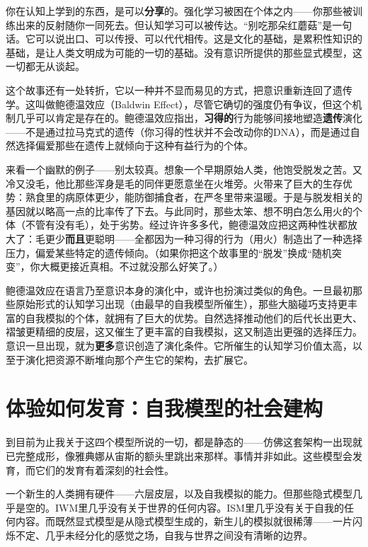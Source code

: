 \documentclass[11pt, twoside, openright]{book}
\begin{document}
你在认知上学到的东西，是可以\textbf{分享}的。强化学习被困在个体之内------你那些被训练出来的反射随你一同死去。但认知学习可以被传达。“别吃那朵红蘑菇”是一句话。它可以说出口、可以传授、可以代代相传。这是文化的基础，是累积性知识的基础，是让人类文明成为可能的一切的基础。没有意识所提供的那些显式模型，这一切都无从谈起。

这个故事还有一处转折，它以一种并不显而易见的方式，把意识重新连回了遗传学。这叫做鲍德温效应（Baldwin Effect），尽管它确切的强度仍有争议，但这个机制几乎可以肯定是存在的。鲍德温效应指出，\textbf{习得的}行为能够间接地塑造\textbf{遗传}演化------不是通过拉马克式的遗传（你习得的性状并不会改动你的DNA），而是通过自然选择偏爱那些在遗传上就倾向于这种有益行为的个体。

来看一个幽默的例子------别太较真。想象一个早期原始人类，他饱受脱发之苦。又冷又没毛，他比那些浑身是毛的同伴更愿意坐在火堆旁。火带来了巨大的生存优势：熟食里的病原体更少，能防御捕食者，在严冬里带来温暖。于是与脱发相关的基因就以略高一点的比率传了下去。与此同时，那些太笨、想不明白怎么用火的个体（不管有没有毛），处于劣势。经过许许多多代，鲍德温效应把这两种性状都放大了：毛更少\textbf{而且}更聪明------全都因为一种习得的行为（用火）制造出了一种选择压力，偏爱某些特定的遗传倾向。（如果你把这个故事里的“脱发”换成“随机突变”，你大概更接近真相。不过就没那么好笑了。）

鲍德温效应在语言乃至意识本身的演化中，或许也扮演过类似的角色。一旦最初那些原始形式的认知学习出现（由最早的自我模型所催生），那些大脑碰巧支持更丰富的自我模拟的个体，就拥有了巨大的优势。自然选择推动他们的后代长出更大、褶皱更精细的皮层，这又催生了更丰富的自我模拟，这又制造出更强的选择压力。意识一旦出现，就为\textbf{更多}意识创造了演化条件。它所催生的认知学习价值太高，以至于演化把资源不断堆向那个产生它的架构，去扩展它。

\section*{体验如何发育：自我模型的社会建构}

到目前为止我关于这四个模型所说的一切，都是静态的------仿佛这套架构一出现就已完整成形，像雅典娜从宙斯的额头里跳出来那样。事情并非如此。这些模型会发育，而它们的发育有着深刻的社会性。

一个新生的人类拥有硬件------六层皮层，以及自我模拟的能力。但那些隐式模型几乎是空的。IWM里几乎没有关于世界的任何内容。ISM里几乎没有关于自我的任何内容。而既然显式模型是从隐式模型生成的，新生儿的模拟就很稀薄------一片闪烁不定、几乎未经分化的感觉之场，自我与世界之间没有清晰的边界。
\end{document}
